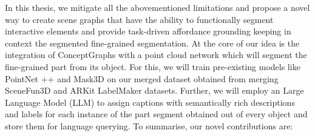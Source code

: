  In this thesis, we mitigate all the abovementioned limitations and propose
a novel way to create scene graphs that have the ability to functionally segment
interactive elements and provide task-driven affordance grounding keeping in context the 
segmented fine-grained segmentation. At the core of our idea is the integration of ConceptGraphs with
a point cloud network which will segment the fine-grained part from its object. For this, we will train pre-existing 
models like PointNet ++ and Mask3D on our merged dataset obtained from merging SceneFun3D and ARKit LabelMaker datasets. 
Further, we will employ an Large Language Model (LLM) to assign captions with semantically rich descriptions and 
labels for each instance of the part segment obtained out of every object and store them for language querying. 
To summarise, our novel contributions are:


